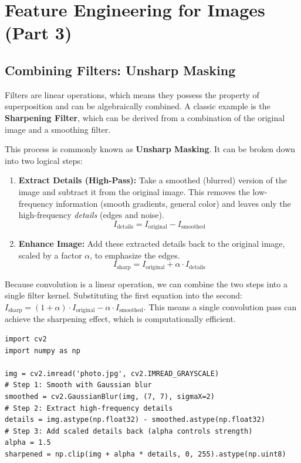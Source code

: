 \chapter*{Feature Engineering for Images (Part 3)}

\section*{Combining Filters: Unsharp Masking}

Filters are linear operations, which means they possess the property of superposition and can be algebraically combined. A classic example is the \textbf{Sharpening Filter}, which can be derived from a combination of the original image and a smoothing filter.

This process is commonly known as \textbf{Unsharp Masking}. It can be broken down into two logical steps:

\begin{enumerate}
    \item \textbf{Extract Details (High-Pass):} Take a smoothed (blurred) version of the image and subtract it from the original image. This removes the low-frequency information (smooth gradients, general color) and leaves only the high-frequency \textit{details} (edges and noise).
    $$ I_{\text{details}} = I_{\text{original}} - I_{\text{smoothed}} $$
    \item \textbf{Enhance Image:} Add these extracted details back to the original image, scaled by a factor $\alpha$, to emphasize the edges.
    $$ I_{\text{sharp}} = I_{\text{original}} + \alpha \cdot I_{\text{details}} $$
\end{enumerate}

\begin{remark}
Because convolution is a linear operation, we can combine the two steps into a single filter kernel. Substituting the first equation into the second: $I_{\text{sharp}} = (1 + \alpha) \cdot I_{\text{original}} - \alpha \cdot I_{\text{smoothed}}$. This means a single convolution pass can achieve the sharpening effect, which is computationally efficient.
\end{remark}

\begin{lstlisting}[style=pythonstyle]
import cv2
import numpy as np

img = cv2.imread('photo.jpg', cv2.IMREAD_GRAYSCALE)
# Step 1: Smooth with Gaussian blur
smoothed = cv2.GaussianBlur(img, (7, 7), sigmaX=2)
# Step 2: Extract high-frequency details
details = img.astype(np.float32) - smoothed.astype(np.float32)
# Step 3: Add scaled details back (alpha controls strength)
alpha = 1.5
sharpened = np.clip(img + alpha * details, 0, 255).astype(np.uint8)
\end{lstlisting}

